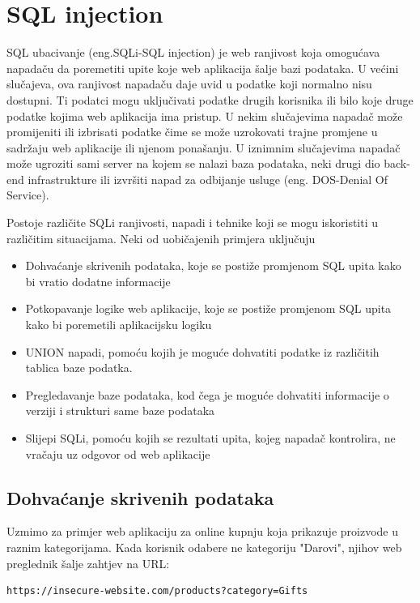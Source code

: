 \documentclass[12pt, oneside, onecolumn]{book}
\begin{document}
{\section{SQL injection}
SQL ubacivanje (eng.SQLi-SQL injection) je web ranjivost koja omogućava napadaču da poremetiti upite koje web aplikacija šalje bazi podataka. U većini slučajeva, ova ranjivost napadaču daje uvid u podatke koji normalno nisu dostupni. Ti podatci mogu uključivati podatke drugih korisnika ili bilo koje druge podatke kojima web aplikacija ima pristup. U nekim slučajevima napadač može promijeniti ili izbrisati podatke čime se može uzrokovati trajne promjene u sadržaju web aplikacije ili njenom ponašanju. U iznimnim slučajevima napadač može ugroziti sami server na kojem se nalazi baza podataka,  neki drugi dio back-end infrastrukture ili izvršiti napad za odbijanje usluge (eng. DOS-Denial Of Service).

Postoje različite SQLi ranjivosti, napadi i tehnike koji se mogu iskoristiti u različitim situacijama. Neki od uobičajenih primjera uključuju \cite{sitesqli}

\begin{itemize}
\item Dohvaćanje skrivenih podataka, koje se postiže promjenom SQL upita kako bi vratio dodatne informacije
\item Potkopavanje logike web aplikacije, koje se postiže promjenom SQL upita kako bi poremetili aplikacijsku logiku
\item UNION napadi, pomoću kojih je moguće dohvatiti podatke iz različitih tablica baze podatka.
\item Pregledavanje baze podataka, kod čega je moguće dohvatiti informacije o verziji i strukturi same baze podataka
\item Slijepi SQLi, pomoću kojih se rezultati upita, kojeg napadač kontrolira, ne vračaju uz odgovor od web aplikacije
\end{itemize}

\subsection{Dohvaćanje skrivenih podataka}
Uzmimo za primjer web aplikaciju za online kupnju koja prikazuje proizvode u raznim kategorijama. Kada korisnik odabere ne kategoriju "Darovi", njihov web preglednik šalje zahtjev na URL:

\begin{verbatim}
https://insecure-website.com/products?category=Gifts
\end{verbatim}

}
\end{document}
